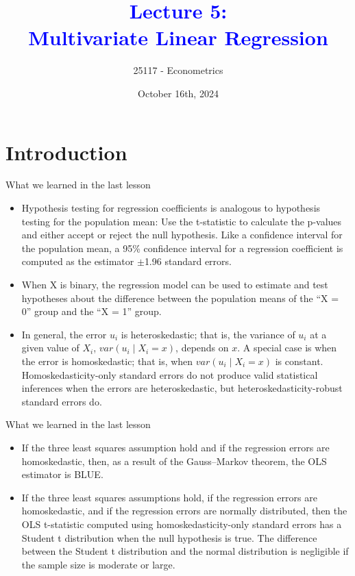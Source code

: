 \documentclass[notes,10pt, aspectratio=169]{beamer}
\title[]{\textcolor{blue}{Lecture 5:\\Multivariate Linear Regression}}
\author{25117 - Econometrics}
\institute[shortinst]{Universitat Pompeu Fabra}
\date{October 16th, 2024}
\begin{document}

\begin{frame}[plain]
\maketitle
\end{frame}

\section{Introduction}

\begin{frame}{What we learned in the last lesson}
\begin{itemize}
    \item Hypothesis testing for regression coefficients is analogous to hypothesis testing for the population mean: Use the t-statistic to calculate the p-values and either accept or reject the null hypothesis. Like a confidence interval for the population mean, a 95\% confidence interval for a regression coefficient is computed as the estimator $\pm$1.96 standard errors.\\[1em]
    \item When X is binary, the regression model can be used to estimate and test hypotheses about the difference between the population means of the “X = 0” group and the “X = 1” group.\\[1em]
    \item In general, the error $u_i$ is heteroskedastic; that is, the variance of $u_i$ at a given value of $X_i$, $var(u_i\mid X_i=x)$, depends on $x$. A special case is when the error is homoskedastic; that is, when $var(u_i\mid X_i=x)$ is constant. \\[1em]Homoskedasticity-only standard errors do not produce valid statistical inferences when the errors are heteroskedastic, but heteroskedasticity-robust standard errors do.\\[1em]
\end{itemize}
\end{frame}

\begin{frame}{What we learned in the last lesson}
\begin{itemize}
    \item If the three least squares assumption hold and if the regression errors are homoskedastic, then, as a result of the Gauss–Markov theorem, the OLS estimator is BLUE.\\[1em]
    \item If the three least squares assumptions hold, if the regression errors are homoskedastic, and if the regression errors are normally distributed, then the OLS t-statistic computed using homoskedasticity-only standard errors has a Student t distribution when the null hypothesis is true. The difference between the Student t distribution and the normal distribution is negligible if the sample size is moderate or large.\\[1em]
\end{itemize}
\end{frame}
\end{document}
